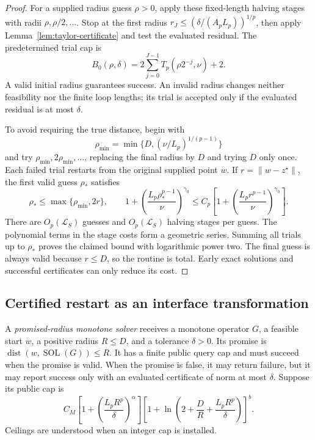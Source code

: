 \documentclass[11pt]{article}
\numberwithin{equation}{section}
\theoremstyle{definition}
\theoremstyle{remark}
\begin{document}
\begin{proof}
For a supplied radius guess \(\rho>0\), apply these fixed-length
halving stages with radii \(\rho,\rho/2,\ldots\). Stop at the first
radius \(r_J\le(\delta/(A_pL_p))^{1/p}\), then apply
Lemma~\ref{lem:taylor-certificate} and test the evaluated residual.
The predetermined trial cap is
\[
B_0(\rho,\delta)
=2\sum_{j=0}^{J-1}T_p(\rho2^{-j},\nu)+2.
\]
A valid initial radius guarantees success. An invalid radius changes
neither feasibility nor the finite loop lengths; its trial is accepted
only if the evaluated residual is at most \(\delta\).

To avoid requiring the true distance, begin with
\[
\rho_{\min}=\min\{D,(\nu/L_p)^{1/(p-1)}\}
\]
and try \(\rho_{\min},2\rho_{\min},\ldots\), replacing the final
radius by \(D\) and trying \(D\) only once. Each failed trial restarts
from the original supplied point \(w\). If
\(r=\|w-z^\star\|\), the first valid guess \(\rho_*\) satisfies
\[
\rho_*\le\max\{\rho_{\min},2r\},
\qquad
1+\left(\frac{L_p\rho_*^{p-1}}{\nu}\right)^{\gamma_0}
\le C_p\left[1+\left(\frac{L_pr^{p-1}}{\nu}\right)^{\gamma_0}\right].
\]
There are \(O_p(\mathcal L_S)\) guesses and
\(O_p(\mathcal L_S)\) halving stages per guess. The polynomial terms
in the stage costs form a geometric series. Summing all trials up to
\(\rho_*\) proves the claimed bound with logarithmic power two.
The final guess is always valid because \(r\le D\), so the routine is
total. Early exact solutions and successful certificates can only reduce
its cost.
\end{proof}

\subsection{Certified restart as an interface transformation}

A \emph{promised-radius monotone solver} receives a monotone operator
\(G\), a feasible start \(w\), a positive radius \(R\le D\), and a
tolerance \(\delta>0\). Its promise is
\(\operatorname{dist}(w,\operatorname{SOL}(G))\le R\).
It has a finite public query cap and must succeed when the promise is
valid. When the promise is false, it may return failure, but it may report
success only with an evaluated certificate of norm at most \(\delta\).
Suppose its public cap is
\begin{equation}\label{eq:monotone-interface}
C_M\left[1+\left(\frac{L_pR^p}{\delta}\right)^\alpha\right]
\left[1+\ln\!\left(2+\frac DR+\frac{L_pR^p}{\delta}\right)\right]^b.
\end{equation}
Ceilings are understood when an integer cap is installed.
\end{document}
